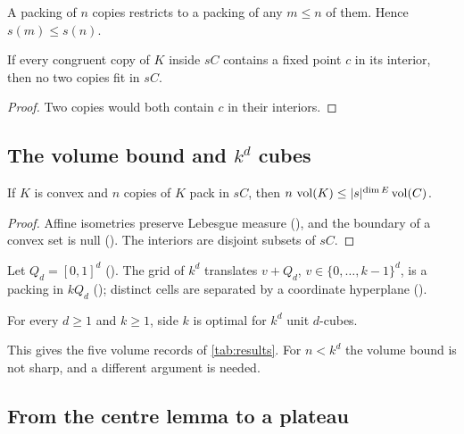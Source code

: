 \documentclass[11pt,a4paper]{article}
\begin{document}
\begin{lemma}
A packing of $n$ copies restricts to a packing of any $m\le n$ of them. Hence $s(m)\le s(n)$.
\end{lemma}

\begin{lemma}\label{lem:common}
If every congruent copy of $K$ inside $sC$ contains a fixed point $c$ in its interior, then no two copies fit in $sC$.
\end{lemma}
\begin{proof}
Two copies would both contain $c$ in their interiors.
\end{proof}

\subsection{\texorpdfstring{The volume bound and $k^d$ cubes}{The volume bound and grids of cubes}}

\begin{theorem}
If $K$ is convex and $n$ copies of $K$ pack in $sC$, then $n\,\operatorname{vol}(K)\le \lvert s\rvert^{\dim E}\operatorname{vol}(C)$.
\end{theorem}
\begin{proof}
Affine isometries preserve Lebesgue measure (), and the boundary of a convex set is null (). The interiors are disjoint subsets of $sC$.
\end{proof}

Let $Q_d=[0,1]^d$ (). The grid of $k^d$ translates $v+Q_d$, $v\in\{0,\dots,k-1\}^d$, is a packing in $kQ_d$ (); distinct cells are separated by a coordinate hyperplane ().

\begin{corollary}
For every $d\ge1$ and $k\ge1$, side $k$ is optimal for $k^d$ unit $d$-cubes.
\end{corollary}

This gives the five volume records of \cref{tab:results}. For $n<k^d$ the volume bound is not sharp, and a different argument is needed.

\subsection{From the centre lemma to a plateau}
\end{document}
